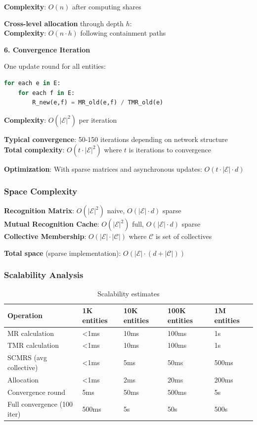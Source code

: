\documentclass[11pt,a4paper]{article}
\theoremstyle{definition}
\theoremstyle{remark}
\newcommand{\E}{\mathcal{E}}
\newcommand{\C}{\mathcal{C}}
\begin{document}
\textbf{Complexity}: $O(n)$ after computing shares

\textbf{Cross-level allocation} through depth $h$:\\
\textbf{Complexity}: $O(n \cdot h)$ following containment paths

\textbf{6. Convergence Iteration}

One update round for all entities:
\begin{lstlisting}[language=Python]
for each e in E:
    for each f in E:
        R_new(e,f) = MR_old(e,f) / TMR_old(e)
\end{lstlisting}

\textbf{Complexity}: $O(|\E|^2)$ per iteration

\textbf{Typical convergence}: 50-150 iterations depending on network structure\\
\textbf{Total complexity}: $O(t \cdot |\E|^2)$ where $t$ is iterations to convergence

\textbf{Optimization}: With sparse matrices and asynchronous updates: $O(t \cdot |\E| \cdot d)$

\subsubsection{Space Complexity}

\textbf{Recognition Matrix}: $O(|\E|^2)$ naive, $O(|\E| \cdot d)$ sparse\\
\textbf{Mutual Recognition Cache}: $O(|\E|^2)$ full, $O(|\E| \cdot d)$ sparse\\
\textbf{Collective Membership}: $O(|\E| \cdot |\C|)$ where $\C$ is set of collectives

\textbf{Total space} (sparse implementation): $O(|\E| \cdot (d + |\C|))$

\subsubsection{Scalability Analysis}

\begin{table}[h]
\centering
\begin{tabular}{lllll}
\toprule
\textbf{Operation} & \textbf{1K entities} & \textbf{10K entities} & \textbf{100K entities} & \textbf{1M entities} \\
\midrule
MR calculation & <1ms & 10ms & 100ms & 1s \\
TMR calculation & <1ms & 10ms & 100ms & 1s \\
SCMRS (avg collective) & <1ms & 5ms & 50ms & 500ms \\
Allocation & <1ms & 2ms & 20ms & 200ms \\
Convergence round & 5ms & 50ms & 500ms & 5s \\
Full convergence (100 iter) & 500ms & 5s & 50s & 500s \\
\bottomrule
\end{tabular}
\caption{Scalability estimates}
\end{table}
\end{document}

